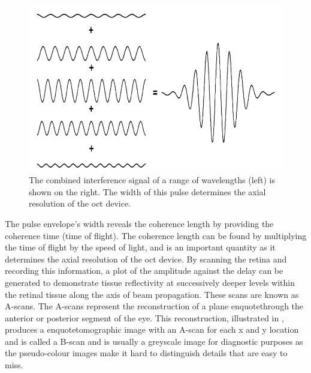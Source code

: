 \begin{figure}[H]
\centering
\includegraphics{figures/morgan_2}
\caption{The combined interference signal of a range of wavelengths (left) is 
shown on the right.  The width of this pulse determines the axial resolution of 
the \Gls{oct} device. \cite{mbib_6} }
\label{fig:m_2}
\end{figure}

The pulse envelope's width reveals the coherence length by providing
the coherence time (time of flight).  The coherence length can be found
by multiplying the time of flight by the speed of light, and is an
important quantity as it determines the axial resolution of the \gls{oct}
device. \cite{mbib_6}  By scanning the retina and recording this
information, a plot of the amplitude against the delay can be generated to
demonstrate tissue reflectivity at successively deeper levels within the
retinal tissue along the axis of beam propagation. \cite{mbib_6}
These scans are known as A-scans.  The A-scans represent the reconstruction
of a plane enquote{through the anterior or posterior segment of the eye}.\cite{mbib_6}
This reconstruction, illustrated in , produces a enquote{tomographic
image with an A-scan for each x and y location} and is called a B-scan and is
usually a greyscale image for diagnostic purposes as the pseudo-colour images
make it hard to distinguish details that are easy to miss. \cite{mbib_5,mbib_4,mbib_7}

